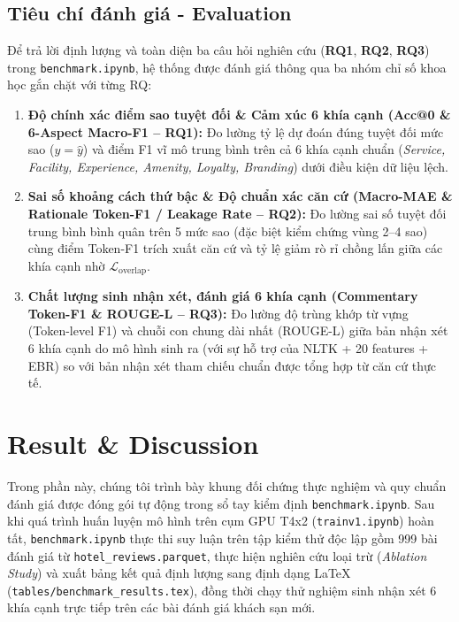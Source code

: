 \documentclass[pdflatex,sn-mathphys-num]{sn-jnl}
\theoremstyle{thmstyleone}
\theoremstyle{thmstyletwo}
\theoremstyle{thmstylethree}
\begin{document}
\subsection{Tiêu chí đánh giá - Evaluation}
\label{subsec:evaluation}

Để trả lời định lượng và toàn diện ba câu hỏi nghiên cứu (\textbf{RQ1}, \textbf{RQ2}, \textbf{RQ3}) trong \texttt{benchmark.ipynb}, hệ thống được đánh giá thông qua ba nhóm chỉ số khoa học gắn chặt với từng RQ:
\begin{enumerate}
    \item \textbf{Độ chính xác điểm sao tuyệt đối \& Cảm xúc 6 khía cạnh (Acc@0 \& 6-Aspect Macro-F1 -- RQ1):} Đo lường tỷ lệ dự đoán đúng tuyệt đối mức sao ($y = \hat{y}$) và điểm F1 vĩ mô trung bình trên cả 6 khía cạnh chuẩn (\textit{Service, Facility, Experience, Amenity, Loyalty, Branding}) dưới điều kiện dữ liệu lệch.
    \item \textbf{Sai số khoảng cách thứ bậc \& Độ chuẩn xác căn cứ (Macro-MAE \& Rationale Token-F1 / Leakage Rate -- RQ2):} Đo lường sai số tuyệt đối trung bình bình quân trên 5 mức sao (đặc biệt kiểm chứng vùng 2--4 sao) cùng điểm Token-F1 trích xuất căn cứ và tỷ lệ giảm rò rỉ chồng lấn giữa các khía cạnh nhờ $\mathcal{L}_{\text{overlap}}$.
    \item \textbf{Chất lượng sinh nhận xét, đánh giá 6 khía cạnh (Commentary Token-F1 \& ROUGE-L -- RQ3):} Đo lường độ trùng khớp từ vựng (Token-level F1) và chuỗi con chung dài nhất (ROUGE-L) giữa bản nhận xét 6 khía cạnh do mô hình sinh ra (với sự hỗ trợ của NLTK + 20 features + EBR) so với bản nhận xét tham chiếu chuẩn được tổng hợp từ căn cứ thực tế.
\end{enumerate}


\section{Result \& Discussion}
\label{sec:resultanddiscussion}

Trong phần này, chúng tôi trình bày khung đối chứng thực nghiệm và quy chuẩn đánh giá được đóng gói tự động trong sổ tay kiểm định \texttt{benchmark.ipynb}. Sau khi quá trình huấn luyện mô hình trên cụm GPU T4x2 (\texttt{trainv1.ipynb}) hoàn tất, \texttt{benchmark.ipynb} thực thi suy luận trên tập kiểm thử độc lập gồm 999 bài đánh giá từ \texttt{hotel\_reviews.parquet}, thực hiện nghiên cứu loại trừ (\textit{Ablation Study}) và xuất bảng kết quả định lượng sang định dạng LaTeX (\texttt{tables/benchmark\_results.tex}), đồng thời chạy thử nghiệm sinh nhận xét 6 khía cạnh trực tiếp trên các bài đánh giá khách sạn mới.
\end{document}
